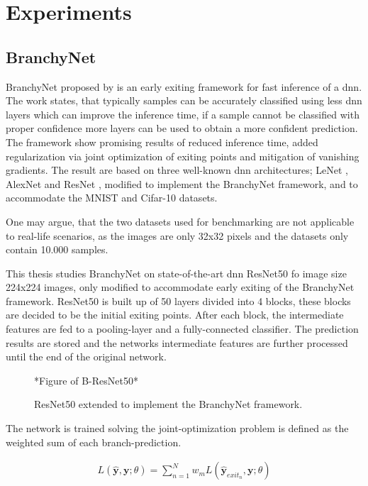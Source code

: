 \section{Experiments}

\subsection{BranchyNet}

BranchyNet \cite{teerapittayanon_branchynet:_2016} proposed by \citeauthor{teerapittayanon_branchynet:_2016} is an early exiting framework for fast inference of a \gls{dnn}. The work states, that typically samples can be accurately classified using less \gls{dnn} layers which can improve the inference time, if a sample cannot be classified with proper confidence more layers can be used to obtain a more confident prediction. The framework show promising results of reduced inference time, added regularization via joint optimization of exiting points and mitigation of vanishing gradients. The result are based on three well-known \gls{dnn} architectures; LeNet \cite{bibid}, AlexNet \cite{bibid} and ResNet \cite{he_deep_2015}, modified to implement the BranchyNet framework, and to accommodate the MNIST \cite{bibid} and Cifar-10 \cite{bibid} datasets. 

One may argue, that the two datasets used for benchmarking are not applicable to real-life scenarios, as the images are only 32x32 pixels and the datasets only contain 10.000 samples.

This thesis studies BranchyNet on state-of-the-art \gls{dnn} ResNet50 fo image size 224x224 images, only modified to accommodate early exiting of the BranchyNet framework. ResNet50 is built up of 50 layers divided into 4 blocks, these blocks are decided to be the initial exiting points. After each block, the intermediate features are fed to a pooling-layer and a fully-connected classifier. The prediction results are stored and the networks intermediate features are further processed until the end of the original network.

\begin{figure}
	*Figure of B-ResNet50*
	\caption[B-ResNet architecture]{ResNet50 extended to implement the BranchyNet framework.}
	\label{b-resnet}
\end{figure}

The network is trained solving the joint-optimization problem is defined as the weighted sum of each branch-prediction.

\begin{align*}
	L(\hat{\mathbf{y}},\mathbf{y};\theta) = \sum_{n=1}^{N} w_m L(\hat{\mathbf{y}}_{exit_n},\mathbf{y};\theta)
\end{align*}

